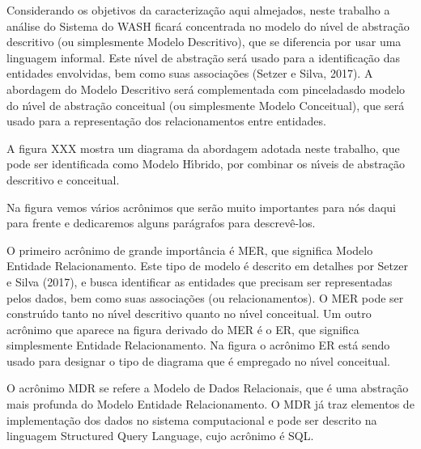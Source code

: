 \documentclass[
12pt,		%
openright,	%
twoside,  %
a4paper,			%
chapter=TITLE,		%
english,			%
french,				%
spanish,			%
brazil				%
]{USPSC-classe/USPSC}
\begin{document}
Considerando os objetivos da caracteriza\c{c}\~ao aqui almejados, neste trabalho a an\'alise do Sistema do WASH ficar\'a concentrada no modelo do n\'{\i}vel de abstra\c{c}\~ao descritivo (ou simplesmente Modelo Descritivo), que se diferencia por usar uma linguagem informal. Este n\'{\i}vel de abstra\c{c}\~ao ser\'a usado para a identifica\c{c}\~ao das entidades envolvidas, bem como suas associa\c{c}\~oes  (Setzer e Silva, 2017). A abordagem do Modelo Descritivo ser\'a complementada com \textquotedbl pinceladas\textquotedbl  do modelo do n\'{\i}vel de abstra\c{c}\~ao conceitual (ou simplesmente Modelo Conceitual), que ser\'a usado para a representa\c{c}\~ao dos relacionamentos entre entidades.









A figura XXX mostra um diagrama da abordagem adotada neste trabalho, que pode ser identificada como \textquotedbl Modelo H\'{\i}brido\textquotedbl , por combinar os n\'{\i}veis de abstra\c{c}\~ao descritivo e conceitual.









Na figura vemos v\'arios acr\^onimos que ser\~ao muito importantes para n\'os daqui para frente e dedicaremos alguns par\'agrafos para descrev\^e-los.









O primeiro acr\^onimo de grande import\^ancia \'e MER, que significa Modelo Entidade Relacionamento. Este tipo de modelo \'e descrito em detalhes por Setzer e Silva (2017), e busca identificar as entidades que precisam ser representadas pelos dados, bem como suas associa\c{c}\~oes (ou relacionamentos). O MER pode ser constru\'{\i}do tanto no n\'{\i}vel descritivo quanto no n\'{\i}vel conceitual. Um outro acr\^onimo que aparece na figura derivado do MER \'e o ER, que significa simplesmente \textquotedbl Entidade Relacionamento\textquotedbl . Na figura o acr\^onimo ER est\'a sendo usado para designar o tipo de diagrama que \'e empregado no n\'{\i}vel conceitual.









O acr\^onimo MDR se refere a Modelo de Dados Relacionais, que \'e uma abstra\c{c}\~ao mais profunda do Modelo Entidade Relacionamento. O MDR j\'a traz elementos de implementa\c{c}\~ao dos dados no sistema computacional e pode ser descrito na linguagem Structured Query Language, cujo acr\^onimo \'e SQL.
\end{document}
